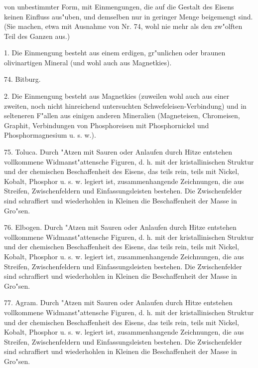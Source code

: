 \documentclass[a4paper, 11pt, oneside, polutonikogreek, german]{article}
\begin{document}
\subsubsection[\swabfamily {Derbes Meteoreisen.}]{}
von unbestimmter Form, mit Einmengungen, die auf die Gestalt des Eisens keinen Einfluss aus"uben, und demselben nur in geringer Menge beigemengt sind. (Sie machen, etwa mit Ausnahme von Nr. 74, wohl nie mehr als den zw"olften Teil des Ganzen aus.)

\vspace{2ex}

1. Die Einmengung besteht aus einem erdigen, gr"unlichen oder braunen olivinartigen Mineral (und wohl auch aus Magnetkies).

\vspace{2ex}

74. Bitburg.

\vspace{2ex}

2. Die Einmengung besteht aus Magnetkies (zuweilen wohl auch aus einer zweiten, noch nicht hinreichend untersuchten Schwefeleisen-Verbindung) und in selteneren F"allen aus einigen anderen Mineralien (Magneteisen, Chromeisen, Graphit, Verbindungen von Phosphoreisen mit Phosphornickel und Phosphormagnesium u. s. w.).

\vspace{2ex}

75. Toluca. Durch "Atzen mit Sauren oder Anlaufen durch Hitze entstehen vollkommene Widmanst"attensche Figuren, d. h. mit der kristallinischen Struktur und der chemischen Beschaffenheit des Eisens, das teils rein, teils mit Nickel, Kobalt, Phosphor u. s. w. legiert ist, zusammenhangende Zeichnungen, die aus Streifen, Zwischenfeldern und Einfassungsleisten bestehen. Die Zwischenfelder sind schraffiert und wiederhohlen in Kleinen die Beschaffenheit der Masse in Gro"sen.

76. Elbogen. Durch "Atzen mit Sauren oder Anlaufen durch Hitze entstehen vollkommene Widmanst"attensche Figuren, d. h. mit der kristallinischen Struktur und der chemischen Beschaffenheit des Eisens, das teils rein, teils mit Nickel, Kobalt, Phosphor u. s. w. legiert ist, zusammenhangende Zeichnungen, die aus Streifen, Zwischenfeldern und Einfassungsleisten bestehen. Die Zwischenfelder sind schraffiert und wiederhohlen in Kleinen die Beschaffenheit der Masse in Gro"sen.

77. Agram. Durch "Atzen mit Sauren oder Anlaufen durch Hitze entstehen vollkommene Widmanst"attensche Figuren, d. h. mit der kristallinischen Struktur und der chemischen Beschaffenheit des Eisens, das teils rein, teils mit Nickel, Kobalt, Phosphor u. s. w. legiert ist, zusammenhangende Zeichnungen, die aus Streifen, Zwischenfeldern und Einfassungsleisten bestehen. Die Zwischenfelder sind schraffiert und wiederhohlen in Kleinen die Beschaffenheit der Masse in Gro"sen.
\end{document}
